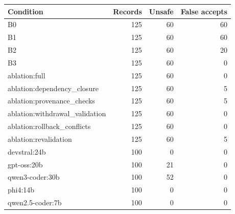\begin{tabular}{lrrr}
Condition & Records & Unsafe & False accepts \\
\hline
B0 & 125 & 60 & 60 \\
B1 & 125 & 60 & 60 \\
B2 & 125 & 60 & 20 \\
B3 & 125 & 60 & 0 \\
ablation:full & 125 & 60 & 0 \\
ablation:dependency\_closure & 125 & 60 & 5 \\
ablation:provenance\_checks & 125 & 60 & 5 \\
ablation:withdrawal\_validation & 125 & 60 & 0 \\
ablation:rollback\_conflicts & 125 & 60 & 0 \\
ablation:revalidation & 125 & 60 & 5 \\
devstral:24b & 100 & 0 & 0 \\
gpt-oss:20b & 100 & 21 & 0 \\
qwen3-coder:30b & 100 & 52 & 0 \\
phi4:14b & 100 & 0 & 0 \\
qwen2.5-coder:7b & 100 & 0 & 0 \\
\end{tabular}

